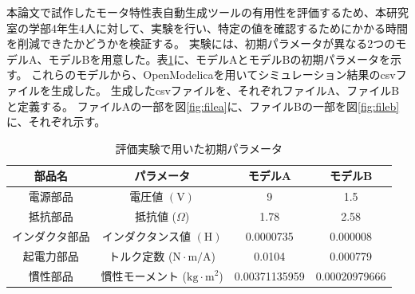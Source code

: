 本論文で試作したモータ特性表自動生成ツールの有用性を評価するため、本研究室の学部4年生4人に対して、実験を行い、特定の値を確認するためにかかる時間を削減できたかどうかを検証する。
実験には、初期パラメータが異なる2つのモデルA、モデルBを用意した。表\ref{tab:syoki}に、モデルAとモデルBの初期パラメータを示す。
これらのモデルから、OpenModelicaを用いてシミュレーション結果のcsvファイルを生成した。
生成したcsvファイルを、それぞれファイルA、ファイルBと定義する。
ファイルAの一部を図\ref{fig:filea}に、ファイルBの一部を図\ref{fig:fileb}に、それぞれ示す。

\begin{table}[t]
	\centering
	\caption{評価実験で用いた初期パラメータ}
	\begin{tabular}{|c|c||c||c|} \hline
	  部品名 & パラメータ & モデルA & モデルB \\ \hline \hline 
 電源部品 & 電圧値 $(\mathrm{V})$ & 9 & 1.5   \\ \hline
 抵抗部品 & 抵抗値 ($\Omega$) & 1.78 & 2.58 \\ \hline
 インダクタ部品 & インダクタンス値 $(\mathrm{H})$ & 0.0000735 & 0.000008  \\ \hline
 起電力部品 & トルク定数 ($\mathrm{N\cdot m/A}$) & 0.0104 & 0.000779  \\ \hline
 慣性部品 & 慣性モーメント ($\mathrm{kg\cdot m^2}$) & 0.00371135959 & 0.00020979666  \\ \hline

	\end{tabular}
	\label{tab:syoki}
  \end{table}


